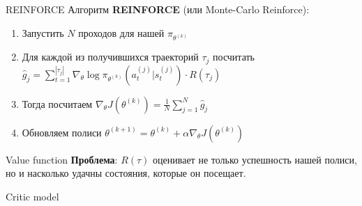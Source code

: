\documentclass[aspectratio=169,12pt,t,compress]{beamer}
\begin{document}
\begin{frame}{REINFORCE}
	Алгоритм \textbf{REINFORCE} (или Monte-Carlo Reinforce):
	\begin{enumerate}
		\item<1-> Запустить $N$ проходов для нашей $\pi _{\theta ^{(k)}}$
		\item<2-> Для каждой из получившихся траекторий $\tau_{j}$ посчитать $\hat{g}_{j} = \sum\limits_{t=1}^{|\tau_{j}|} \nabla_{\theta }\log \pi_{\theta ^{(k)}}(a_{t}^{(j)}|s_{t}^{(j)})\cdot R(\tau_{j})$
		\item<3-> Тогда посчитаем $\nabla_{\theta}J(\theta ^{(k)}) = \frac{1}{N} \sum\limits_{j=1}^N \hat{g}_{j}$
		\item<4-> Обновляем полиси $\theta ^{(k+1)} = \theta ^{(k)} + \alpha \nabla_{\theta}J(\theta ^{(k)})$
	\end{enumerate}
\end{frame}

\begin{frame}{Value function}
	\textbf{Проблема}: $R(\tau)$ оценивает не только успешность нашей полиси, но и насколько удачны состояния, которые он посещает.

\end{frame}

\begin{frame}{Critic model}
\end{frame}
\end{document}
